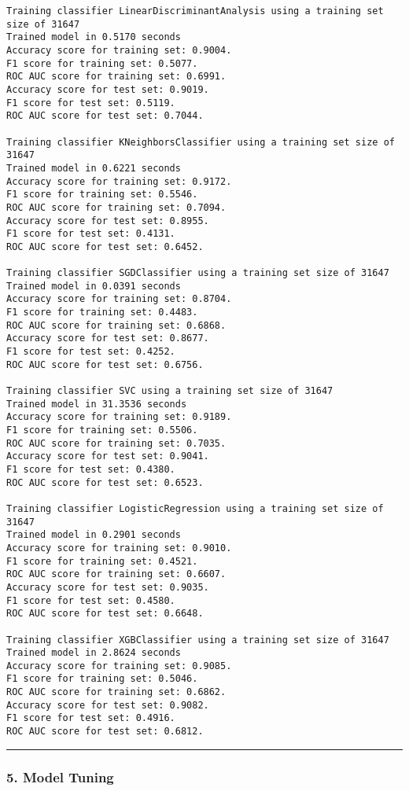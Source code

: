 \documentclass[11pt]{article}
\begin{document}
\begin{Verbatim}[commandchars=\\\{\}]
Training classifier LinearDiscriminantAnalysis using a training set size of 31647
Trained model in 0.5170 seconds
Accuracy score for training set: 0.9004.
F1 score for training set: 0.5077.
ROC AUC score for training set: 0.6991.
Accuracy score for test set: 0.9019.
F1 score for test set: 0.5119.
ROC AUC score for test set: 0.7044.

Training classifier KNeighborsClassifier using a training set size of 31647
Trained model in 0.6221 seconds
Accuracy score for training set: 0.9172.
F1 score for training set: 0.5546.
ROC AUC score for training set: 0.7094.
Accuracy score for test set: 0.8955.
F1 score for test set: 0.4131.
ROC AUC score for test set: 0.6452.

Training classifier SGDClassifier using a training set size of 31647
Trained model in 0.0391 seconds
Accuracy score for training set: 0.8704.
F1 score for training set: 0.4483.
ROC AUC score for training set: 0.6868.
Accuracy score for test set: 0.8677.
F1 score for test set: 0.4252.
ROC AUC score for test set: 0.6756.

Training classifier SVC using a training set size of 31647
Trained model in 31.3536 seconds
Accuracy score for training set: 0.9189.
F1 score for training set: 0.5506.
ROC AUC score for training set: 0.7035.
Accuracy score for test set: 0.9041.
F1 score for test set: 0.4380.
ROC AUC score for test set: 0.6523.

Training classifier LogisticRegression using a training set size of 31647
Trained model in 0.2901 seconds
Accuracy score for training set: 0.9010.
F1 score for training set: 0.4521.
ROC AUC score for training set: 0.6607.
Accuracy score for test set: 0.9035.
F1 score for test set: 0.4580.
ROC AUC score for test set: 0.6648.

Training classifier XGBClassifier using a training set size of 31647
Trained model in 2.8624 seconds
Accuracy score for training set: 0.9085.
F1 score for training set: 0.5046.
ROC AUC score for training set: 0.6862.
Accuracy score for test set: 0.9082.
F1 score for test set: 0.4916.
ROC AUC score for test set: 0.6812.

    \end{Verbatim}

    \begin{center}\rule{0.5\linewidth}{\linethickness}\end{center}

\subsubsection{5. Model Tuning}\label{model-tuning}
\end{document}
